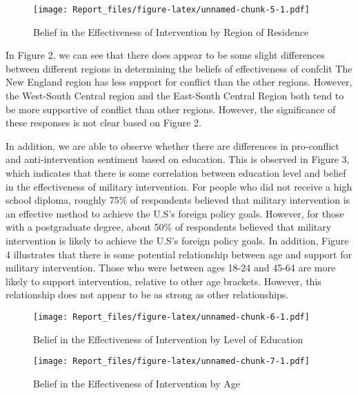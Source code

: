 \documentclass[
  11pt,
]{article}
\begin{document}
\begin{figure}
\centering
\texttt{[image: Report\_files/figure-latex/unnamed-chunk-5-1.pdf]}
\caption{Belief in the Effectiveness of Intervention by Region of
Residence}
\end{figure}

In Figure 2, we can see that there does appear to be some slight
differences between different regions in determining the beliefs of
effectiveness of confclit The New England region has less support for
conflict than the other regions. However, the West-South Central region
and the East-South Central Region both tend to be more supportive of
conflict than other regions. However, the significance of these
responses is not clear based on Figure 2.

In addition, we are able to observe whether there are differences in
pro-conflict and anti-intervention sentiment based on education. This is
observed in Figure 3, which indicates that there is some correlation
between education level and belief in the effectiveness of military
intervention. For people who did not receive a high school diploma,
roughly 75\% of respondents believed that military intervention is an
effective method to achieve the U.S's foreign policy goals. However, for
those with a postgraduate degree, about 50\% of respondents believed
that military intervention is likely to achieve the U.S's foreign policy
goals. In addition, Figure 4 illustrates that there is some potential
relationship between age and support for military intervention. Those
who were between ages 18-24 and 45-64 are more likely to support
intervention, relative to other age brackets. However, this relationship
does not appear to be as strong as other relationships.

\begin{figure}
\centering
\texttt{[image: Report\_files/figure-latex/unnamed-chunk-6-1.pdf]}
\caption{Belief in the Effectiveness of Intervention by Level of
Education}
\end{figure}

\begin{figure}
\centering
\texttt{[image: Report\_files/figure-latex/unnamed-chunk-7-1.pdf]}
\caption{Belief in the Effectiveness of Intervention by Age}
\end{figure}
\end{document}
